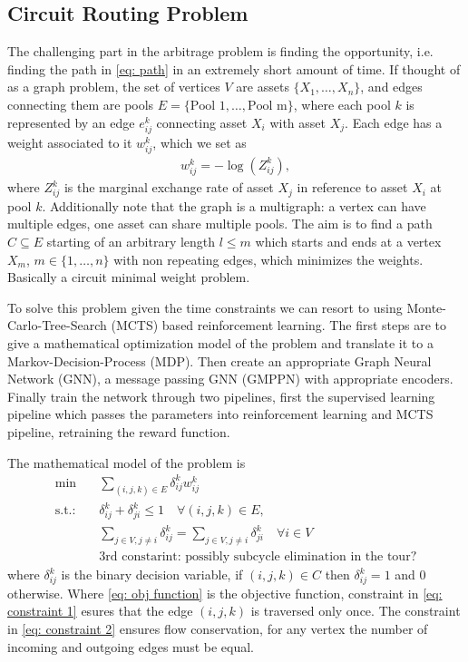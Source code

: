 \subsection{Circuit Routing Problem}
The challenging part in the arbitrage problem is finding the opportunity,
i.e. finding the path in \ref{eq: path} in an extremely short amount of time.
If thought of as a graph problem, the set of vertices $V$ are assets $\{X_1,
\ldots, X_n\}$, and edges connecting them are pools $E = \{\text{Pool 1},
\ldots, \text{Pool m}\}$, where each pool $k$ is represented by an edge
$e_{ij}^{k}$ connecting asset $X_i$ with asset $X_j$. Each edge has a weight
associated to it $w^{k}_{ij}$, which we set as
\begin{align}
    w_{ij}^{k} = -\log(Z_{ij}^{k}),
\end{align}
where $Z_{ij}^{k}$ is the marginal exchange rate of asset $X_j$ in reference
to asset $X_i$ at pool $k$. Additionally note that the graph is a multigraph:
a vertex can have multiple edges, one asset can share multiple pools. The aim
is to find a path $C\subseteq E$ starting of an arbitrary length $l \le m$
which starts and ends at a vertex $X_m$, $m\in\{1,\ldots,n\}$ with non
repeating edges, which minimizes the weights. Basically a circuit minimal
weight problem.
\newline

To solve this problem given the time constraints we can
resort to using Monte-Carlo-Tree-Search (MCTS) based reinforcement learning.
The first steps are to give a mathematical optimization model of the problem
and translate it to a Markov-Decision-Process (MDP). Then create an
appropriate Graph Neural Network (GNN), a message passing GNN (GMPPN) with
appropriate encoders. Finally train the network through two pipelines, first the
supervised learning pipeline which passes the parameters into reinforcement
learning and MCTS pipeline, retraining the reward function.
\newline

The mathematical model of the problem is
\begin{align}
    \min \quad& \sum_{(i,j,k) \in E} \delta_{ij}^{k} w_{ij}^{k} \label{eq:
    obj function}\\
    \text{s.t.:}\quad & \delta_{ij}^{k} + \delta_{ji}^{k} \le 1 \quad \forall
    (i,j,k) \in E, \label{eq: constraint 1} \\
    & \sum_{j\in V, j\neq i} \delta^{k}_{ij} = \sum_{j \in V, j\neq i}
    \delta^{k}_{ji} \quad \forall i \in V \label{eq: constraint 2} \\
    & \text{3rd constarint: possibly subcycle elimination in the tour?}
\end{align}
where $\delta_{ij}^{k}$ is the binary decision variable, if $(i,j,k) \in C$
then $\delta_{ij}^{k} = 1$ and 0 otherwise. Where \ref{eq: obj function} is
the objective function, constraint in \ref{eq: constraint 1} esures that the
edge $(i, j, k)$ is traversed only once. The constraint in \ref{eq:
constraint 2} ensures flow conservation, for any vertex the number of
incoming and outgoing edges must be equal.
\newline

